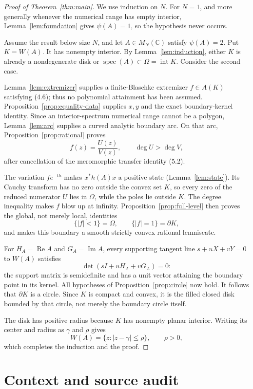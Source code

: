 \documentclass[11pt]{article}
\theoremstyle{definition}
\theoremstyle{remark}
\newcommand{\C}{\mathbb C}
\newcommand{\spec}{\operatorname{spec}}
\newcommand{\Rea}{\operatorname{Re}}
\newcommand{\Ima}{\operatorname{Im}}
\newcommand{\Int}{\operatorname{int}}
\begin{document}
\begin{proof}[Proof of Theorem~\ref{thm:main}]
We use induction on \(N\).  For \(N=1\), and more generally whenever the
numerical range has empty interior, Lemma~\ref{lem:foundation} gives
\(\psi(A)=1\), so the hypothesis never occurs.

Assume the result below size \(N\), and let \(A\in M_N(\C)\) satisfy
\(\psi(A)=2\).  Put \(K=W(A)\).  It has nonempty interior.  By
Lemma~\ref{lem:induction}, either \(K\) is already a nondegenerate disk or
\(\spec(A)\subset\Omega=\Int K\).  Consider the second case.

Lemma~\ref{lem:extremizer} supplies a finite-Blaschke extremizer
\(f\in A(K)\) satisfying (4.6); thus no polynomial attainment has been
assumed.  Proposition~\ref{prop:equality-data} supplies \(x,y\) and the exact
boundary-kernel identity.  Since an interior-spectrum numerical range cannot
be a polygon, Lemma~\ref{lem:arc} supplies a curved analytic boundary arc.
On that arc, Proposition~\ref{prop:rational} proves
\[
 f(z)=\frac{U(z)}{V(z)},\qquad \deg U>\deg V,
\]
after cancellation of the meromorphic transfer identity (5.2).

The variation \(fe^{-th}\) makes \(x^*h(A)x\) a positive state
(Lemma~\ref{lem:state}).  Its Cauchy transform has no zero outside the convex
set \(K\), so every zero of the reduced numerator \(U\) lies in \(\Omega\),
while the poles lie outside \(K\).  The degree inequality makes \(f\) blow up
at infinity.  Proposition~\ref{prop:full-level} then proves the global, not
merely local, identities
\[
 \{|f|<1\}=\Omega,\qquad \{|f|=1\}=\partial K,
\]
and makes this boundary a smooth strictly convex rational lemniscate.

For \(H_A=\Rea A\) and \(G_A=\Ima A\), every supporting tangent line
\(s+uX+vY=0\) to \(W(A)\) satisfies
\[
 \det(sI+uH_A+vG_A)=0:
\]
the support matrix is semidefinite and has a unit vector attaining the
boundary point in its kernel.  All hypotheses of
Proposition~\ref{prop:circle} now hold.  It follows that \(\partial K\) is a
circle.  Since \(K\) is compact and convex, it is the filled closed disk
bounded by that circle, not merely the boundary circle itself.

The disk has positive radius because \(K\) has nonempty planar interior.
Writing its center and radius as \(\gamma\) and \(\rho\) gives
\[
 W(A)=\{z:|z-\gamma|\leq\rho\},\qquad \rho>0,
\]
which completes the induction and the proof.
\end{proof}

\section*{Context and source audit}
\end{document}
